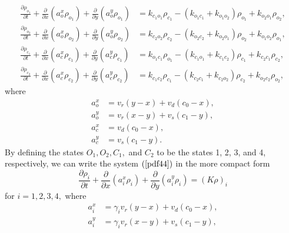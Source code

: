\begin{align}
\frac{\partial\rho_{o_{1}}}{\partial t}+\frac{\partial}{\partial x}\left(
a_{o}^{x}\rho_{o_{1}}\right)  +\frac{\partial}{\partial y}\left(  a_{o}%
^{y}\rho_{o_{1}}\right)   &  =k_{c_{1}o_{1}}\rho_{c_{1}}-\left(  k_{o_{1}%
c_{1}}+k_{o_{1}o_{2}}\right)  \rho_{o_{1}}+k_{o_{2}o_{1}}\rho_{o_{2}%
},\nonumber\\
\frac{\partial\rho_{o_{2}}}{\partial t}+\frac{\partial}{\partial x}\left(
a_{o}^{x}\rho_{o_{2}}\right)  +\frac{\partial}{\partial y}\left(  a_{o}%
^{y}\rho_{o_{2}}\right)   &  =k_{c_{2}o_{2}}\rho_{c_{2}}-\left(  k_{o_{2}c_{2}%
}+k_{o_{2}o_{1}}\right)  \rho_{o_{2}}+k_{o_{1}o_{2}}\rho_{o_{1}}%
,\label{pdf44}\\
\frac{\partial\rho_{c_{1}}}{\partial t}+\frac{\partial}{\partial x}\left(
a_{c}^{x}\rho_{c_{1}}\right)  +\frac{\partial}{\partial y}\left(  a_{c}%
^{y}\rho_{c_{1}}\right)   &  =k_{o_{1}c_{1}}\rho_{o_{1}}-\left(  k_{c_{1}%
o_{1}}+k_{c_{1}c_{2}}\right)  \rho_{c_{1}}+k_{c_{2}c_{1}}\rho_{c_{2}%
},\nonumber\\
\frac{\partial\rho_{c_{2}}}{\partial t}+\frac{\partial}{\partial x}\left(
a_{c}^{x}\rho_{c_{2}}\right)  +\frac{\partial}{\partial y}\left(  a_{c}%
^{y}\rho_{c_{2}}\right)   &  =k_{c_{1}c_{2}}\rho_{c_{1}}-\left(  k_{c_{2}%
c_{1}}+k_{c_{2}o_{2}}\right)  \rho_{c_{2}}+k_{o_{2}c_{2}}\rho_{o_{2}%
},\nonumber
\end{align}
where %
\begin{align}
a_{o}^{x} &  =v_{r}\left(  y-x\right)  +v_{d}\left(  c_{0}-x\right)
,\nonumber\\
a_{o}^{y} &  =v_{r}\left(  x-y\right)  +v_{s}\left(  c_{1}-y\right)
,\label{flux44}\\
a_{c}^{x} &  =v_{d}\left(  c_{0}-x\right)  ,\nonumber\\
a_{c}^{y} &  =v_{s}\left(  c_{1}-y\right)  .\nonumber
\end{align}
By defining the states $O_{1},O_{2},C_{1},$ and $C_{2}$ to be the states 
1, 2, 3, and
4, respectively, we can write the system $(\ref{pdf44})$ in the more compact form%
\begin{equation}
\frac{\partial\rho_{i}}{\partial t}+\frac{\partial}{\partial x}\left(
a_{i}^{x}\rho_{i}\right)  +\frac{\partial}{\partial y}\left(  a_{i}^{y}%
\rho_{i}\right)  =\left(  K\rho\right)  _{i}\label{compact44}%
\end{equation}
for $i=1,2,3,4,$ where%
\begin{align*}
a_{i}^{x} &  =\gamma_{i}v_{r}\left(  y-x\right)  +v_{d}\left(  c_{0}-x\right)
,\\
a_{i}^{y} &  =\gamma_{i}v_{r}\left(  x-y\right)  +v_{s}\left(  c_{1}-y\right),
\end{align*}
